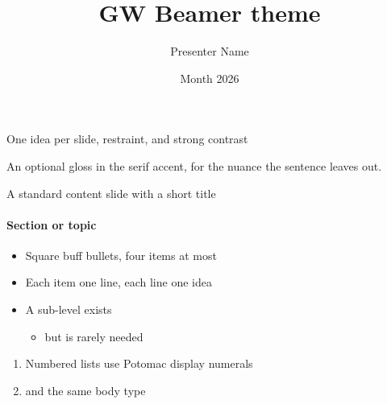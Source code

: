 \documentclass[aspectratio=169]{beamer}
\title{GW Beamer theme}
\author{Presenter Name}
\date{Month 2026}
\begin{document}
    {One idea per slide, restraint, and strong contrast}{}

    {An optional gloss in the serif accent, for the nuance the sentence leaves out.}

\begin{frame}[t]{A standard content slide with a short title}
    \framesubtitle{Section or topic}
    \begin{itemize}
        \setlength{\itemsep}{0.25cm}
        \item Square buff bullets, four items at most
        \item Each item one line, each line one idea
        \item A sub-level exists \begin{itemize}\item but is rarely needed\end{itemize}
    \end{itemize}
    \vspace{0.3cm}
    \begin{enumerate}
        \setlength{\itemsep}{0.2cm}
        \item Numbered lists use Potomac display numerals
        \item and the same body type
    \end{enumerate}
\end{frame}
\end{document}
